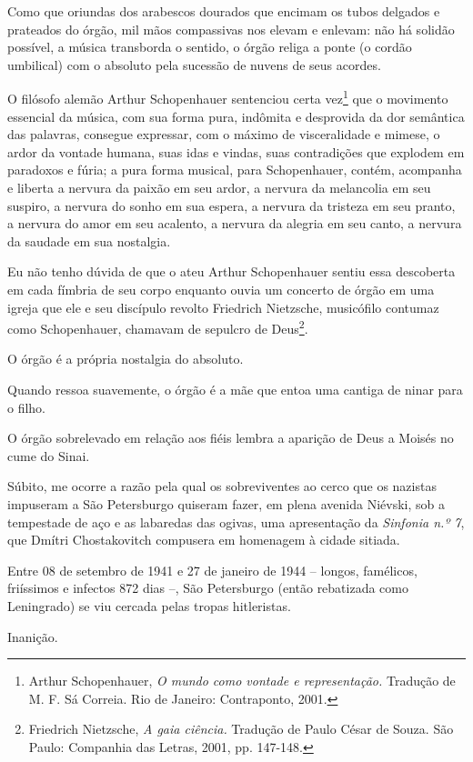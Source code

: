 Como que oriundas dos arabescos dourados que encimam os tubos delgados e
prateados do órgão, mil mãos compassivas nos elevam e enlevam: não há
solidão possível, a música transborda o sentido, o órgão religa a ponte
(o cordão umbilical) com o absoluto pela sucessão de nuvens de seus
acordes.

O filósofo alemão Arthur Schopenhauer sentenciou certa vez\footnote{Arthur
  Schopenhauer, \emph{O mundo como vontade e representação.} Tradução de
  M. F. Sá Correia. Rio de Janeiro: Contraponto, 2001.} que o movimento
essencial da música, com sua forma pura, indômita e desprovida da dor
semântica das palavras, consegue expressar, com o máximo de
visceralidade e mimese, o ardor da vontade humana, suas idas e vindas,
suas contradições que explodem em paradoxos e fúria; a pura forma
musical, para Schopenhauer, contém, acompanha e liberta a nervura da
paixão em seu ardor, a nervura da melancolia em seu suspiro, a nervura
do sonho em sua espera, a nervura da tristeza em seu pranto, a nervura
do amor em seu acalento, a nervura da alegria em seu canto, a nervura da
saudade em sua nostalgia.

Eu não tenho dúvida de que o ateu Arthur Schopenhauer sentiu essa
descoberta em cada fímbria de seu corpo enquanto ouvia um concerto de
órgão em uma igreja que ele e seu discípulo revolto Friedrich Nietzsche,
musicófilo contumaz como Schopenhauer, chamavam de sepulcro de
Deus\footnote{Friedrich Nietzsche, \emph{A gaia ciência.} Tradução de
  Paulo César de Souza. São Paulo: Companhia das Letras, 2001, pp.
  147-148.}.

O órgão é a própria nostalgia do absoluto.

Quando ressoa suavemente, o órgão é a mãe que entoa uma cantiga de ninar
para o filho.

O órgão sobrelevado em relação aos fiéis lembra a aparição de Deus a
Moisés no cume do Sinai.

Súbito, me ocorre a razão pela qual os sobreviventes ao cerco que os
nazistas impuseram a São Petersburgo quiseram fazer, em plena avenida
Niévski, sob a tempestade de aço e as labaredas das ogivas, uma
apresentação da \emph{Sinfonia n.º 7}, que Dmítri Chostakovitch
compusera em homenagem à cidade sitiada.

Entre 08 de setembro de 1941 e 27 de janeiro de 1944 -- longos,
famélicos, friíssimos e infectos 872 dias --, São Petersburgo (então
rebatizada como Leningrado) se viu cercada pelas tropas hitleristas.

Inanição.

